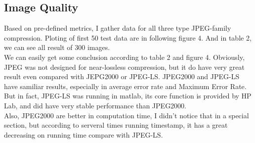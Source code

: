 \documentclass[UTF8, letterpaper, 14pt]{article}
\begin{document}
\subsection{Image Quality}
Based on pre-defined metrics, I gather data for all three type JPEG-family compression. Ploting of first 50 test data are in following figure 4. And in table 2, we can see all result of 300 images.\\
We can easily get some conclusion according to table 2 and figure 4. Obviously, JPEG was not designed for near-lossless compression, but it do have very great result even compared with JEPG2000 or JPEG-LS. JPEG2000 and JPEG-LS have samiliar results, especially in average error rate and Maximum Error Rate. But in fact, JPEG-LS was running in matlab, its core function is provided by HP Lab\cite{hplab}, and did have very stable performance than JPEG2000.\\
Also, JPEG2000 are better in computation time, I didn't notice that in a special section, but according to serveral times running timestamp, it has a great decreasing on running time compare with JPEG-LS.
\end{document}
